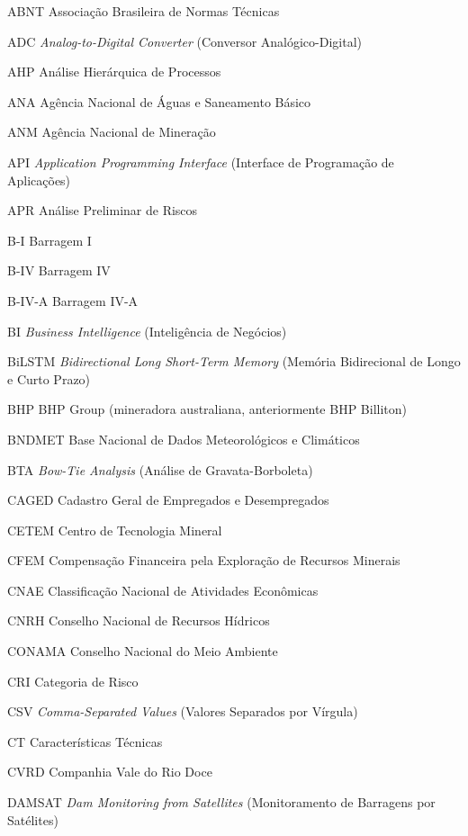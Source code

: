 \begin{siglas}
    \item[ABNT] Associação Brasileira de Normas Técnicas
    \item[ADC] \textit{Analog-to-Digital Converter} (Conversor Analógico-Digital)
    \item[AHP] Análise Hierárquica de Processos
    \item[ANA] Agência Nacional de Águas e Saneamento Básico
    \item[ANM] Agência Nacional de Mineração
    \item[API] \textit{Application Programming Interface} (Interface de Programação de Aplicações)
    \item[APR] Análise Preliminar de Riscos
    \item[B-I] Barragem I
    \item[B-IV] Barragem IV
    \item[B-IV-A] Barragem IV-A
    \item[BI] \textit{Business Intelligence} (Inteligência de Negócios)
    \item[BiLSTM] \textit{Bidirectional Long Short-Term Memory} (Memória Bidirecional de Longo e Curto Prazo)
    \item[BHP] BHP Group (mineradora australiana, anteriormente BHP Billiton)
    \item[BNDMET] Base Nacional de Dados Meteorológicos e Climáticos
    \item[BTA] \textit{Bow-Tie Analysis} (Análise de Gravata-Borboleta)
    \item[CAGED] Cadastro Geral de Empregados e Desempregados
    \item[CETEM] Centro de Tecnologia Mineral
    \item[CFEM] Compensação Financeira pela Exploração de Recursos Minerais
    \item[CNAE] Classificação Nacional de Atividades Econômicas
    \item[CNRH] Conselho Nacional de Recursos Hídricos
    \item[CONAMA] Conselho Nacional do Meio Ambiente
    \item[CRI] Categoria de Risco
    \item[CSV] \textit{Comma-Separated Values} (Valores Separados por Vírgula)
    \item[CT] Características Técnicas
    \item[CVRD] Companhia Vale do Rio Doce
    \item[DAMSAT] \textit{Dam Monitoring from Satellites} (Monitoramento de Barragens por Satélites)

\end{siglas}
